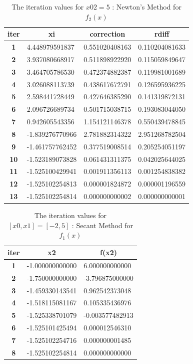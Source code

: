 \documentclass[a4paper, 12pt]{report}
\begin{document}
\begin{table}[h]
\centering
\begin{tabular}{|c|l|l|l|}
\hline
\textbf{iter} & \multicolumn{1}{c|}{\textbf{xi}} & \multicolumn{1}{c|}{\textbf{correction}} & \multicolumn{1}{c|}{\textbf{rdiff}} \\ \hline
\textbf{1}  & 4.448979591837  & 0.551020408163 & 0.110204081633 \\ \hline
\textbf{2}  & 3.937080668917  & 0.511898922920 & 0.115059849647 \\ \hline
\textbf{3}  & 3.464705786530  & 0.472374882387 & 0.119981001689 \\ \hline
\textbf{4}  & 3.026088113739  & 0.438617672791 & 0.126595936225 \\ \hline
\textbf{5}  & 2.598441728449  & 0.427646385290 & 0.141319872131 \\ \hline
\textbf{6}  & 2.096726689734  & 0.501715038715 & 0.193083044050 \\ \hline
\textbf{7}  & 0.942605543356  & 1.154121146378 & 0.550439478845 \\ \hline
\textbf{8}  & -1.839276770966 & 2.781882314322 & 2.951268782504 \\ \hline
\textbf{9}  & -1.461757762452 & 0.377519008514 & 0.205254051197 \\ \hline
\textbf{10} & -1.523189073828 & 0.061431311375 & 0.042025644025 \\ \hline
\textbf{11} & -1.525100429941 & 0.001911356113 & 0.001254838382 \\ \hline
\textbf{12} & -1.525102254813 & 0.000001824872 & 0.000001196559 \\ \hline
\textbf{13} & -1.525102254814 & 0.000000000002 & 0.000000000001 \\ \hline
\end{tabular}
\caption{The iteration values for $x02 = 5$ : Newton's Method for $f_{2}(x)$}
\label{table:8}
\end{table}
\begin{table}[h]
\centering
\begin{tabular}{|c|l|l|}
\hline
\textbf{iter} & \multicolumn{1}{c|}{\textbf{x2}} & \multicolumn{1}{c|}{\textbf{f(x2)}} \\ \hline
\textbf{1} & -1.000000000000 & 6.000000000000  \\ \hline
\textbf{2} & -1.750000000000 & -3.796875000000 \\ \hline
\textbf{3} & -1.459330143541 & 0.962542373048  \\ \hline
\textbf{4} & -1.518115081167 & 0.105335436976  \\ \hline
\textbf{5} & -1.525338701079 & -0.003577482913 \\ \hline
\textbf{6} & -1.525101425494 & 0.000012546310  \\ \hline
\textbf{7} & -1.525102254716 & 0.000000001485  \\ \hline
\textbf{8} & -1.525102254814 & 0.000000000000  \\ \hline
\end{tabular}
\caption{The iteration values for $[x0,x1] = [-2,5]$ : Secant Method for $f_{1}(x)$}
\label{table:9}
\end{table}
\end{document}
